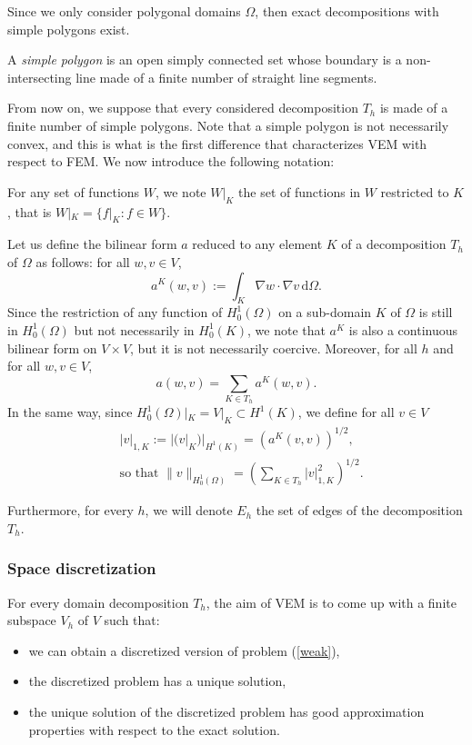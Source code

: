 \noindent Since we only consider polygonal domains $\Omega$, then exact decompositions with simple polygons exist. 

\begin{definition}
A \textit{simple polygon} is an open simply connected set whose boundary is a non-intersecting line made of a finite number of straight line segments. 
\end{definition}

\noindent From now on, we suppose that every considered decomposition $T_h$ is made of a finite number of simple polygons. Note that a simple polygon is not necessarily convex, and this is what is the first difference that characterizes VEM with respect to FEM. We now introduce the following notation: 
\begin{notation}
For any set of functions $W$, we note $W|_K$ the set of functions in $W$ restricted to $K$, that is $W|_K = \{f|_K : f\in W\}$. 
\end{notation}

\noindent Let us define the bilinear form $a$ reduced to any element $K$ of a decomposition $T_h$ of $\Omega$ as follows: for all $w,v\in V$,
$$ a^K(w,v) := \int_K \nabla w \cdot \nabla v \, \mathrm{d}\Omega. $$
Since the restriction of any function of $H_0^1(\Omega)$ on a sub-domain $K$ of $\Omega$ is still in $H_0^1(\Omega)$ but not necessarily in $H_0^1(K)$, we note that $a^K$ is also a continuous bilinear form on $V\times V$, but it is not necessarily coercive. Moreover, for all $h$ and for all $w,v\in V$, \begin{equation}\label{aKvsa}
a(w,v) = \sum_{K\in T_h} a^K(w,v).
\end{equation}
In the same way, since $H_0^1(\Omega)|_K = V|_K \subset H^1(K)$, we define for all $v\in V$
\begin{align}
&|v|_{1, K} := |(v|_K)|_{H^1(K)} = \left( a^K\left( v,v \right)\right)^{1/2}, \label{def1Knorm}\\
&\text{so that } \|v\|_{H_0^1(\Omega)} = \left(\sum_{K\in T_h} |v|_{1,K}^2\right)^{1/2}.\label{H01normsplit}
\end{align} 

\noindent Furthermore, for every $h$, we will denote $E_h$ the set of edges of the decomposition $T_h$. 

\subsubsection{Space discretization}
For every domain decomposition $T_h$, the aim of VEM is to come up with a finite subspace $V_h$ of $V$ such that:
\begin{itemize}
\item we can obtain a discretized version of problem (\ref{weak}),
\item the discretized problem has a unique solution,
\item the unique solution of the discretized problem has good approximation properties with respect to the exact solution. 
\end{itemize}

